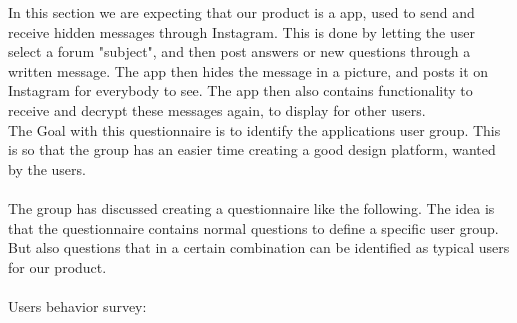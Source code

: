 \documentclass[11pt]{article}
\begin{document}
In this section we are expecting that our product is a app, used to send and receive hidden messages through Instagram. This is done by letting the user select a forum "subject", and then post answers or new questions through a written message. The app then hides the message in a picture, and posts it on Instagram for everybody to see. The app then also contains functionality to receive and decrypt these messages again, to display for other users.\\
The Goal with this questionnaire is to identify the applications user group. This is so that the group has an easier time creating a good design platform, wanted by the users.\\\\
\noindent
The group has discussed creating a questionnaire like the following.
The idea is that the questionnaire contains normal questions to define a specific user group.
But also questions that in a certain combination can be identified as typical users for our product.\\\\
\noindent
Users behavior survey:
\end{document}
